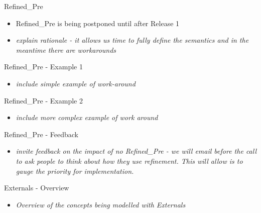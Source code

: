 \documentclass{beamer}
\begin{document}
\begin{frame}{Refined\_Pre}

  \begin{itemize}
  \item Refined\_Pre is being postponed until after Release 1
  \item \emph{explain rationale - it allows us time to fully define the semantics and in the meantime there are workarounds}
  \end{itemize}
 
\end{frame}

\begin{frame}{Refined\_Pre - Example 1}

  \begin{itemize}
  \item \emph{include simple example of work-around}
  \end{itemize}
 
\end{frame}

\begin{frame}{Refined\_Pre - Example 2}

  \begin{itemize}
  \item \emph{include more complex example of work around}
  \end{itemize}
 
\end{frame}

\begin{frame}{Refined\_Pre - Feedback}

  \begin{itemize}
  \item \emph{invite feedback on the impact of no Refined\_Pre - we will email before the call to ask people to think about how they use refinement. This will allow is to gauge the priority for implementation.}
  \end{itemize}
 
\end{frame}

\begin{frame}{Externals - Overview}

  \begin{itemize}
  \item \emph{Overview of the concepts being modelled with Externals}
  \end{itemize}
 
\end{frame}
\end{document}
